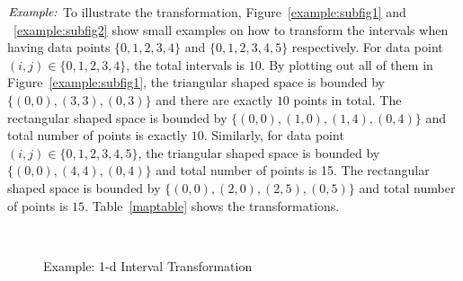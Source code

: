 \documentclass[AMA,LATO1COL]{WileyNJD-v2}
\begin{document}
$\noindent \textit {Example:}$ To illustrate the transformation, Figure~\ref{example:subfig1} and ~\ref{example:subfig2} show small examples on how to transform the intervals when having data points $\{0,1,2,3,4\}$ and $\{0,1,2,3,4,5\}$ respectively. For data point $(i,j)\in \{0,1,2,3,4\}$, the total intervals is $10$. By plotting out all of them in Figure~\ref{example:subfig1}, the triangular shaped space is bounded by $\{(0,0), (3,3), (0,3)\}$ and there are exactly $10$ points in total. The rectangular shaped space is bounded by $\{(0,0),(1,0), (1,4),(0,4)\}$ and total number of points is exactly $10$. Similarly, for data point $(i,j)\in \{0,1,2,3,4,5\}$,  the triangular shaped space is bounded by $\{(0,0),(4,4),(0,4)\}$ and total number of points is 15. The rectangular shaped space is bounded by $\{(0,0),(2,0),(2,5),(0,5)\}$ and total number of points is $15$. Table~\ref{maptable} shows the transformations.

\begin{figure}[h]
\centering
{}
~~
\caption{Example: 1-d Interval Transformation}\label{example}
\end{figure}
\end{document}
